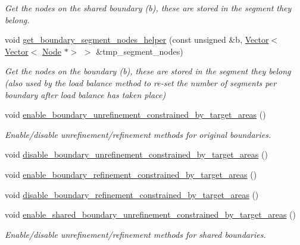 \begin{DoxyCompactItemize}
\begin{DoxyCompactList}\small\item\em Get the nodes on the shared boundary (b), these are stored in the segment they belong. \end{DoxyCompactList}\item 
void \hyperlink{classoomph_1_1RefineableTriangleMesh_aad6d4838c8e0e61359ad48f10a01bacd}{get\+\_\+boundary\+\_\+segment\+\_\+nodes\+\_\+helper} (const unsigned \&b, \hyperlink{classoomph_1_1Vector}{Vector}$<$ \hyperlink{classoomph_1_1Vector}{Vector}$<$ \hyperlink{classoomph_1_1Node}{Node} $\ast$$>$ $>$ \&tmp\+\_\+segment\+\_\+nodes)
\begin{DoxyCompactList}\small\item\em Get the nodes on the boundary (b), these are stored in the segment they belong (also used by the load balance method to re-\/set the number of segments per boundary after load balance has taken place) \end{DoxyCompactList}\item 
void \hyperlink{classoomph_1_1RefineableTriangleMesh_a2bac2ff237ca916e19d8ed632fef9fa4}{enable\+\_\+boundary\+\_\+unrefinement\+\_\+constrained\+\_\+by\+\_\+target\+\_\+areas} ()
\begin{DoxyCompactList}\small\item\em Enable/disable unrefinement/refinement methods for original boundaries. \end{DoxyCompactList}\item 
void \hyperlink{classoomph_1_1RefineableTriangleMesh_a1c02ef23cd60668f2fa34f13bbc7b5ba}{disable\+\_\+boundary\+\_\+unrefinement\+\_\+constrained\+\_\+by\+\_\+target\+\_\+areas} ()
\item 
void \hyperlink{classoomph_1_1RefineableTriangleMesh_a6aa74a37a5c5416613c8a6d12ad7320c}{enable\+\_\+boundary\+\_\+refinement\+\_\+constrained\+\_\+by\+\_\+target\+\_\+areas} ()
\item 
void \hyperlink{classoomph_1_1RefineableTriangleMesh_a58d4a0b0d1d72b325d738affcef905e9}{disable\+\_\+boundary\+\_\+refinement\+\_\+constrained\+\_\+by\+\_\+target\+\_\+areas} ()
\item 
void \hyperlink{classoomph_1_1RefineableTriangleMesh_a3c1e3be7d06a03d0707f4f9f68c168b9}{enable\+\_\+shared\+\_\+boundary\+\_\+unrefinement\+\_\+constrained\+\_\+by\+\_\+target\+\_\+areas} ()
\begin{DoxyCompactList}\small\item\em Enable/disable unrefinement/refinement methods for shared boundaries. \end{DoxyCompactList}\item 
$$
\end{DoxyCompactItemize}
